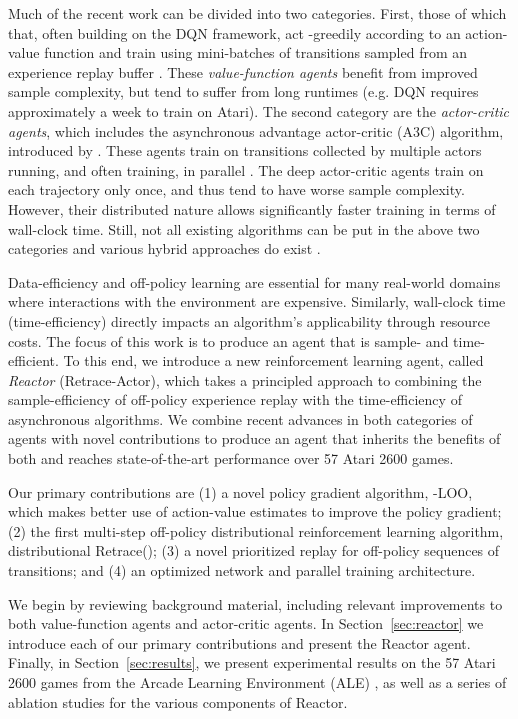 \documentclass{article}
\begin{document}
Much of the recent work can be divided into two categories. First, 
those of which that, often building on the DQN framework, 
act -greedily according to an action-value function and train 
using mini-batches of transitions sampled from 
an experience replay buffer \citep{van2016deep,wang2015dueling,he2016learning,anschel2017averaged}. These \textit{value-function agents} benefit from 
improved sample complexity, but tend to 
suffer from long runtimes (e.g. DQN requires approximately a week to train on 
Atari). The second category are the
\textit{actor-critic agents}, which includes the asynchronous advantage actor-critic (A3C) algorithm,
introduced by \citet{mnih2016asynchronous}. These agents train on 
transitions collected by multiple actors running, 
and often training, in parallel \citep{schulman2017proximal,vezhnevets2017feudal}. The deep actor-critic agents train on each 
trajectory only once, and thus tend to have 
worse sample complexity. However, their distributed nature allows significantly 
faster training in terms of wall-clock time.
Still, not all existing algorithms can be put in the above two categories and 
various hybrid approaches do exist 
\citep{zhao2016deep,o2016combining,gu2016q,wang2017sample}.

Data-efficiency and off-policy learning are essential for many 
real-world domains where 
interactions with the environment are expensive. Similarly, wall-clock time 
(time-efficiency) directly impacts an algorithm's 
applicability through resource costs. The focus of this work is to produce an agent that 
is sample- and time-efficient. To this end, we introduce a new reinforcement learning agent, 
called {\em Reactor} (Retrace-Actor), which 
takes a principled approach to combining the sample-efficiency of off-policy 
experience replay with the time-efficiency 
of asynchronous algorithms. We combine recent advances in both 
categories of agents with novel contributions to produce an 
agent that inherits the benefits of both and reaches state-of-the-art 
performance over 57 Atari 2600 games.

Our primary contributions are (1) a novel policy gradient algorithm, 
-LOO, which makes better use of action-value estimates to improve the 
policy gradient; (2) the first multi-step off-policy distributional reinforcement 
learning algorithm, distributional Retrace(); (3) a novel prioritized 
replay for off-policy sequences of transitions; and (4) an optimized network and 
parallel training architecture.

We begin by reviewing background material, including relevant improvements to 
both value-function agents and actor-critic agents. In Section~\ref{sec:reactor} 
we introduce each of our primary contributions and present the Reactor agent. 
Finally, in Section~\ref{sec:results}, 
we present experimental results on the 57 Atari 2600 games from the Arcade 
Learning Environment (ALE) \citep{bellemare2013arcade}, as well as a series of 
ablation studies for the various components of Reactor.
\end{document}
